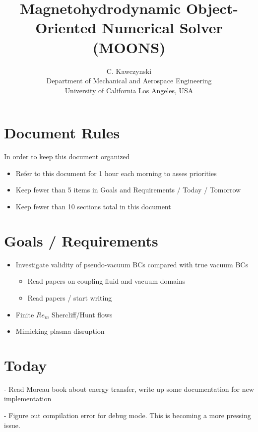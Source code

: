 \documentclass[11pt]{article}
\begin{document}
\doublespacing
\title{Magnetohydrodynamic Object-Oriented Numerical Solver (MOONS)}
\author{C. Kawczynski \\
Department of Mechanical and Aerospace Engineering \\
University of California Los Angeles, USA\\
}
\maketitle

\section{Document Rules}
In order to keep this document organized
\begin{itemize}
\item Refer to this document for 1 hour each morning to asses priorities
\item Keep fewer than 5 items in Goals and Requirements / Today / Tomorrow
\item Keep fewer than 10 sections total in this document
\end{itemize}

\section{Goals / Requirements}

\begin{itemize}
\item Investigate validity of pseudo-vacuum BCs compared with true vacuum BCs
	\begin{itemize}
	\item Read papers on coupling fluid and vacuum domains
	\item Read papers / start writing
	\end{itemize}
\item Finite $Re_m$ Shercliff/Hunt flows
\item Mimicking plasma disruption
\end{itemize}


\section{Today}

- Read Moreau book about energy transfer, write up some documentation for new implementation

- Figure out compilation error for debug mode. This is becoming a more pressing issue.
\end{document}
